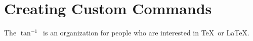 \documentclass[12pt]{article}
\begin{document}
 
\newcommand{\atanv}{$\tan^{-1}{}$} 
\section{Creating Custom Commands} 
The \atanv\ is an organization for people who are interested in \TeX\ or \LaTeX. 
\end{document}
